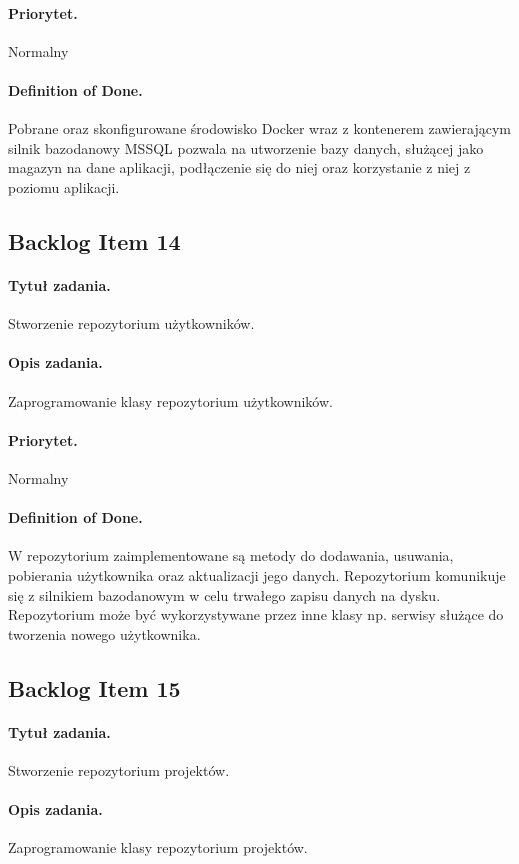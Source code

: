 \documentclass[a4paper]{article}
\begin{document}
\paragraph{Priorytet.} Normalny
\paragraph{Definition of Done.} Pobrane oraz skonfigurowane środowisko Docker wraz z kontenerem zawierającym silnik bazodanowy MSSQL pozwala na utworzenie bazy danych, służącej jako magazyn na dane aplikacji, podłączenie się do niej oraz korzystanie z niej z poziomu aplikacji.

\subsection{Backlog Item 14} 
\paragraph{Tytuł zadania.} Stworzenie repozytorium użytkowników.
\paragraph{Opis zadania.} Zaprogramowanie klasy repozytorium użytkowników.
\paragraph{Priorytet.} Normalny
\paragraph{Definition of Done.} W repozytorium zaimplementowane są metody do dodawania, usuwania, pobierania użytkownika oraz aktualizacji jego danych. Repozytorium komunikuje się z silnikiem bazodanowym w celu trwałego zapisu danych na dysku. Repozytorium może być wykorzystywane przez inne klasy np. serwisy służące do tworzenia nowego użytkownika.

\subsection{Backlog Item 15} 
\paragraph{Tytuł zadania.} Stworzenie repozytorium projektów.
\paragraph{Opis zadania.} Zaprogramowanie klasy repozytorium projektów.
\end{document}
